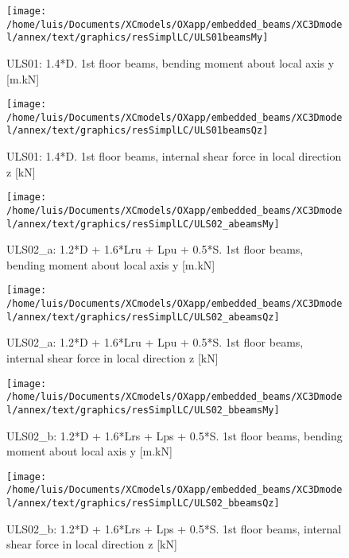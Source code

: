 \begin{figure}
\begin{center}
\texttt{[image: /home/luis/Documents/XCmodels/OXapp/embedded\_beams/XC3Dmodel/annex/text/graphics/resSimplLC/ULS01beamsMy]}
\caption{ULS01: 1.4*D. 1st floor beams, bending moment about local axis y [m.kN]}
\end{center}
\end{figure}
\begin{figure}
\begin{center}
\texttt{[image: /home/luis/Documents/XCmodels/OXapp/embedded\_beams/XC3Dmodel/annex/text/graphics/resSimplLC/ULS01beamsQz]}
\caption{ULS01: 1.4*D. 1st floor beams, internal shear force in local direction z [kN]}
\end{center}
\end{figure}
\clearpage
\begin{figure}
\begin{center}
\texttt{[image: /home/luis/Documents/XCmodels/OXapp/embedded\_beams/XC3Dmodel/annex/text/graphics/resSimplLC/ULS02\_abeamsMy]}
\caption{ULS02_a: 1.2*D + 1.6*Lru + Lpu + 0.5*S. 1st floor beams, bending moment about local axis y [m.kN]}
\end{center}
\end{figure}
\begin{figure}
\begin{center}
\texttt{[image: /home/luis/Documents/XCmodels/OXapp/embedded\_beams/XC3Dmodel/annex/text/graphics/resSimplLC/ULS02\_abeamsQz]}
\caption{ULS02_a: 1.2*D + 1.6*Lru + Lpu + 0.5*S. 1st floor beams, internal shear force in local direction z [kN]}
\end{center}
\end{figure}
\clearpage
\begin{figure}
\begin{center}
\texttt{[image: /home/luis/Documents/XCmodels/OXapp/embedded\_beams/XC3Dmodel/annex/text/graphics/resSimplLC/ULS02\_bbeamsMy]}
\caption{ULS02_b: 1.2*D + 1.6*Lrs + Lps + 0.5*S. 1st floor beams, bending moment about local axis y [m.kN]}
\end{center}
\end{figure}
\begin{figure}
\begin{center}
\texttt{[image: /home/luis/Documents/XCmodels/OXapp/embedded\_beams/XC3Dmodel/annex/text/graphics/resSimplLC/ULS02\_bbeamsQz]}
\caption{ULS02_b: 1.2*D + 1.6*Lrs + Lps + 0.5*S. 1st floor beams, internal shear force in local direction z [kN]}
\end{center}
\end{figure}

